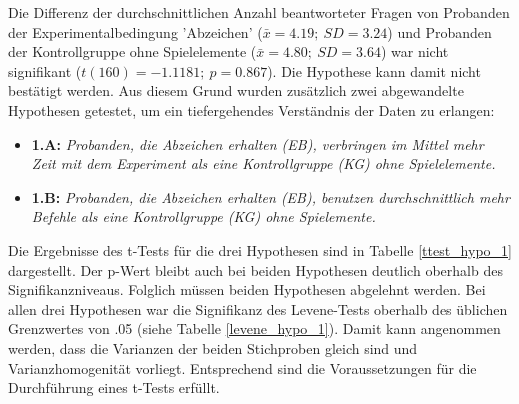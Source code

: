 Die Differenz der durchschnittlichen Anzahl beantworteter Fragen von Probanden der Experimentalbedingung 'Abzeichen' ($\bar{x} =4.19;\:SD=3.24$) und Probanden der Kontrollgruppe ohne Spielelemente ($\bar{x} =4.80;\:SD=3.64$) war nicht signifikant ($t (160) = -1.1181;\: p = 0.867$). Die Hypothese kann damit nicht bestätigt werden. Aus diesem Grund wurden zusätzlich zwei abgewandelte Hypothesen getestet, um ein tiefergehendes Verständnis der Daten zu erlangen:

\begin{itemize}
    \item \textbf{1.A:} \textit{Probanden, die Abzeichen erhalten (EB), verbringen im Mittel mehr Zeit mit dem Experiment als eine Kontrollgruppe (KG) ohne Spielelemente.}
    \item \textbf{1.B:} \textit{Probanden, die Abzeichen erhalten (EB), benutzen durchschnittlich mehr Befehle als eine Kontrollgruppe (KG) ohne Spielemente.} 
\end{itemize}

Die Ergebnisse des t-Tests für die drei Hypothesen sind in Tabelle \ref{ttest_hypo_1} dargestellt. Der p-Wert bleibt auch bei beiden Hypothesen deutlich oberhalb des Signifikanzniveaus. Folglich müssen beiden Hypothesen abgelehnt werden. Bei allen drei Hypothesen war die Signifikanz des Levene-Tests oberhalb des üblichen Grenzwertes von .05 (siehe Tabelle \ref{levene_hypo_1}). Damit kann angenommen werden, dass die Varianzen der beiden Stichproben gleich sind und Varianzhomogenität vorliegt. Entsprechend sind die Voraussetzungen für die Durchführung eines t-Tests erfüllt.

